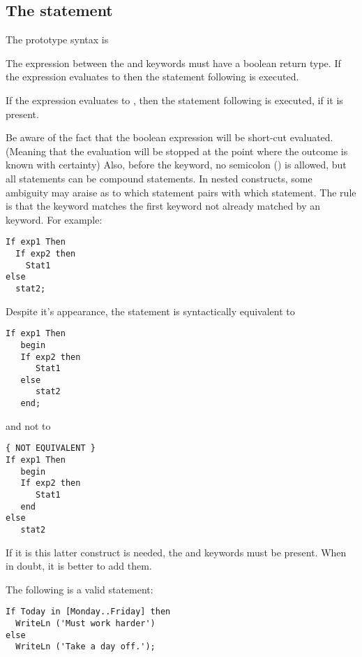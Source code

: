 \subsection{The  statement}
The  prototype syntax is

The expression between the  and  keywords must have a
boolean return type. If the expression evaluates to  then the
statement following  is executed.

If the expression evaluates to , then the statement following
 is executed, if it is present.

Be aware of the fact that the boolean expression will be short-cut evaluated.
(Meaning that the evaluation will be stopped at the point where the
 outcome is known with certainty)
Also, before the  keyword,  no semicolon (\var{;}) is allowed,
but all statements can be compound statements.
In nested  constructs, some ambiguity may araise as
to which   statement pairs with which  statement. The rule
is that the  keyword matches the first  keyword not
already matched by an  keyword.
For example:
\begin{verbatim}
If exp1 Then
  If exp2 then
    Stat1
else
  stat2;
\end{verbatim}
Despite it's appearance, the statement is syntactically equivalent to
\begin{verbatim}
If exp1 Then
   begin
   If exp2 then
      Stat1
   else
      stat2
   end;
\end{verbatim}
and not to
\begin{verbatim}
{ NOT EQUIVALENT }
If exp1 Then
   begin
   If exp2 then
      Stat1
   end
else
   stat2
\end{verbatim}
If it is this latter construct is needed, the  and 
keywords must be present. When in doubt, it is better to add them.

The following is a valid statement:
\begin{verbatim}
If Today in [Monday..Friday] then
  WriteLn ('Must work harder')
else
  WriteLn ('Take a day off.');
\end{verbatim}
